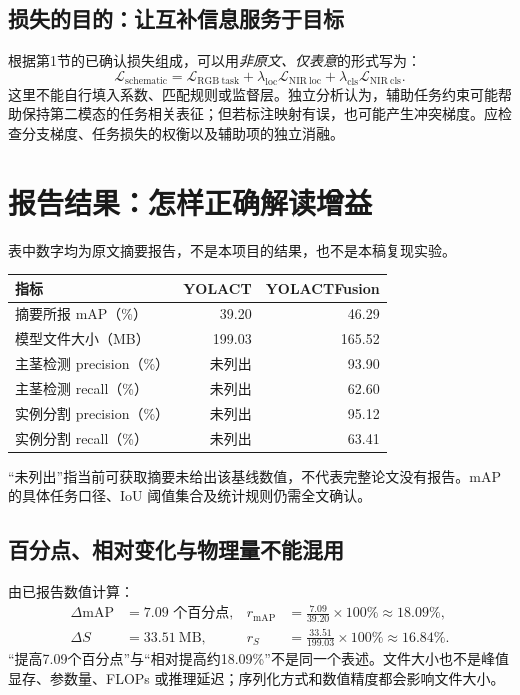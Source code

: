 \documentclass[UTF8,a4paper,11pt,fontset=windows]{ctexart}
\renewcommand{\arraystretch}{1.28}
\newcommand{\newpagepart}{\clearpage}
\begin{document}
\subsection{损失的目的：让互补信息服务于目标}
根据第1节的已确认损失组成，可以用\emph{非原文、仅表意}的形式写为：
\begin{equation}
  \mathcal L_{\mathrm{schematic}}
  =\mathcal L_{\mathrm{RGB\ task}}
   +\lambda_{\mathrm{loc}}\mathcal L_{\mathrm{NIR\ loc}}
   +\lambda_{\mathrm{cls}}\mathcal L_{\mathrm{NIR\ cls}}.
\end{equation}
这里不能自行填入系数、匹配规则或监督层。独立分析认为，辅助任务约束可能帮助保持第二模态的任务相关表征；但若标注映射有误，也可能产生冲突梯度。应检查分支梯度、任务损失的权衡以及辅助项的独立消融。

\newpagepart
\section{报告结果：怎样正确解读增益}\label{sec:results}
\noindent 表中数字均为原文摘要报告\cite{liu2023}，不是本项目的结果，也不是本稿复现实验。
\begin{center}
\renewcommand{\arraystretch}{1.12}
\begin{tabularx}{\linewidth}{@{}Yrr@{}}
\toprule
指标 & YOLACT & YOLACTFusion\\
\midrule
摘要所报 mAP（\%） & 39.20 & 46.29\\
模型文件大小（MB） & 199.03 & 165.52\\
主茎检测 precision（\%） & 未列出 & 93.90\\
主茎检测 recall（\%） & 未列出 & 62.60\\
实例分割 precision（\%） & 未列出 & 95.12\\
实例分割 recall（\%） & 未列出 & 63.41\\
\bottomrule
\end{tabularx}
\end{center}
\noindent\small “未列出”指当前可获取摘要未给出该基线数值，不代表完整论文没有报告。mAP 的具体任务口径、IoU 阈值集合及统计规则仍需全文确认。\normalsize

\subsection{百分点、相对变化与物理量不能混用}
由已报告数值计算：
\begin{align}
  \Delta\mathrm{mAP}&=7.09\text{ 个百分点},&
  r_{\mathrm{mAP}}&=\frac{7.09}{39.20}\times100\%\approx18.09\%,\\
  \Delta S&=33.51\ \mathrm{MB},&
  r_S&=\frac{33.51}{199.03}\times100\%\approx16.84\%.
\end{align}
“提高7.09个百分点”与“相对提高约18.09\%”不是同一个表述。文件大小也不是峰值显存、参数量、FLOPs 或推理延迟；序列化方式和数值精度都会影响文件大小。
\end{document}
